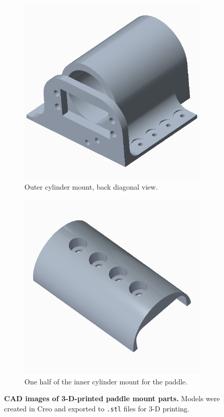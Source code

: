 \documentclass[letterpaper, 11pt]{article}
\begin{document}
\begin{figure}[ht]
\begin{subfigure}[t]{0.48\textwidth}
        \includegraphics[height=0.25\textheight]{images/outer-mount2.png}
        \caption{Outer cylinder mount, back diagonal view.}
    \end{subfigure}

    \begin{subfigure}[t]{0.48\textwidth}
        \centering
        \includegraphics[height=0.25\textheight]{images/inner-mount.png}
        \caption{One half of the inner cylinder mount for the paddle.}
    \end{subfigure}
    \caption{\textbf{CAD images of 3-D-printed paddle mount parts.} Models were created in Creo and exported to \texttt{.stl} files for 3-D printing.}
    \label{fig:paddle}
\end{figure}
\end{document}
